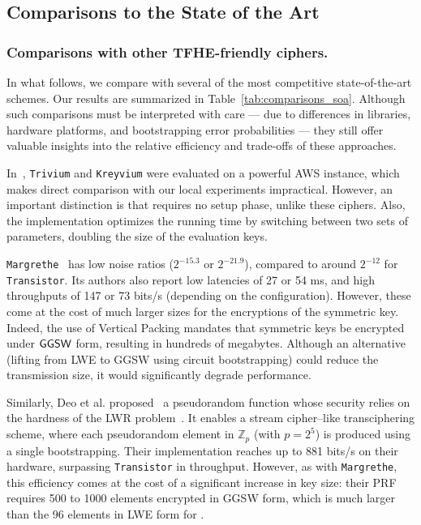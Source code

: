 \subsection{Comparisons to the State of the Art}
\label{sec:perfs_soa}	

\subsubsection{Comparisons with other TFHE-friendly ciphers.} 
In what follows, we compare \coolName with several of the most competitive state-of-the-art schemes. Our results are summarized in Table~\ref{tab:comparisons_soa}.
Although such comparisons must be interpreted with care — due to differences in libraries, hardware platforms, and bootstrapping error probabilities — they still offer valuable insights into the relative efficiency and trade-offs of these approaches.


In~\cite{DBLP:conf/wahc/BalenboisOS23}, \texttt{Trivium} and \texttt{Kreyvium} were evaluated on a powerful AWS instance, which makes direct comparison with our local experiments impractical. However, an important distinction is that \coolName requires no setup phase, unlike these ciphers. Also, the implementation optimizes the running time by switching between two sets of parameters, doubling the size of the evaluation keys.

\texttt{Margrethe}~\cite{EPRINT:AGHM24} has low noise ratios ($2^{-15.3}$ or $2^{-21.9}$), compared to around $2^{-12}$ for \texttt{Transistor}. Its authors also report low latencies of 27 or 54 ms, and high throughputs of 147 or 73 bits/s (depending on the configuration). However, these come at the cost of much larger sizes for the encryptions of the symmetric key. Indeed, the use of Vertical Packing mandates that symmetric keys be encrypted under $\textsf{GGSW}$ form, resulting in hundreds of megabytes. Although an alternative (lifting from LWE to GGSW using circuit bootstrapping) could reduce the transmission size, it would significantly degrade performance. 

Similarly, Deo et al. proposed~\cite{EPRINT:DJLCB24} a pseudorandom function whose security relies on the hardness of the LWR problem~\cite{EC:BanPeiRos12}. It enables a stream cipher–like transciphering scheme, where each pseudorandom element in $\mathbb{Z}_p$ (with $p=2^5$) is produced using a single bootstrapping. Their implementation reaches up to 881 bits/s on their hardware, surpassing \texttt{Transistor} in throughput. However, as with \texttt{Margrethe}, this efficiency comes at the cost of a significant increase in key size: their PRF requires 500 to 1000 elements encrypted in GGSW form, which is much larger than the 96 elements in LWE form for \coolName.


